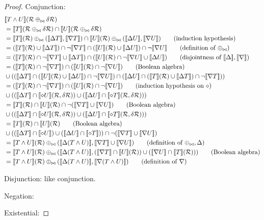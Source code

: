 \begin{proof}
  Conjunction:
  \begin{align*}
    &\sem{T \wedge U}(\semR \twist \diffR)\\
    &= \sem{T}(\semR \twist \diffR) \cap \sem{U}(\semR \twist \diffR)\\
    &= \sem{T}(\semR) \twist (\upsem{T}, \downsem{T}) 
      \cap \sem{U}(\semR) \twist (\upsem{U}, \downsem{U}) \tag{induction hypothesis}\\
    &= (\sem{T}(\semR) \cup \upsem{T}) \cap \neg \downsem{T} 
      \cap (\sem{U}(\semR) \cup \upsem{U}) \cap \neg \downsem{U} \tag{definition of $\twist$}\\
    &= (\sem{T}(\semR) \cap \neg \downsem{T} \cup \upsem{T})
      \cap (\sem{U}(\semR) \cap \neg \downsem{U} \cup \upsem{U}) \tag{disjointness of $\upsem{}, \downsem{}$}\\
    &= (\sem{T}(\semR) \cap \neg \downsem{T}) \cap (\sem{U}(\semR) \cap \neg \downsem{U}) \tag{Boolean algebra}\\
    & \cup ((\upsem{T} \cap (\sem{U}(\semR) \cup \upsem{U}) \cap \neg \downsem{U})
      \cap (\upsem{U} \cap (\sem{T}(\semR) \cup \upsem{T}) \cap \neg \downsem{T}))\\
    &= (\sem{T}(\semR) \cap \neg \downsem{T}) \cap (\sem{U}(\semR) \cap \neg \downsem{U}) \tag{induction hypothesis on $\bothdiff$}\\
    & \cup ((\upsem{T} \cap \bothsem{U}(\semR, \diffR))
            \cup (\upsem{U} \cap \bothsem{T}(\semR, \diffR)))\\
    &= \sem{T}(\semR) \cap \sem{U}(\semR) \cap \neg (\downsem{T} \cup \downsem{U}) \tag{Boolean algebra}\\
      &\cup ((\upsem{T} \cap \bothsem{U}(\semR, \diffR))
            \cup (\upsem{U} \cap \bothsem{T}(\semR, \diffR)))\\
    &= \sem{T}(\semR) \cap \sem{U}(\semR) \tag{Boolean algebra}\\
    & \cup ((\upsem{T} \cap \bothsem{U})
            \cup (\upsem{U} \cap \bothsem{T}))
      \cap \neg (\downsem{T} \cup \downsem{U})\\
    &= \sem{T \wedge U}(\semR)
      \twist (\upsem{(T \wedge U)}, \downsem{T} \cup \downsem{U}) \tag{definition of $\twist, \updiff$}\\
    &= \sem{T \wedge U}(\semR)
      \twist (\upsem{(T \wedge U)}, 
      (\downsem{T} \cap \sem{U}(\semR)) \cup (\downsem{U} \cap \sem{T}(\semR))) \tag{Boolean algebra}\\
    &= \sem{T \wedge U}(\semR)
      \twist (\upsem{(T \wedge U)}, \downsem{(T \wedge U)}) \tag{definition of $\downdiff{}$}
  \end{align*}
  
  Disjunction: like conjunction.
  
  Negation:

  Existential:

\end{proof}

